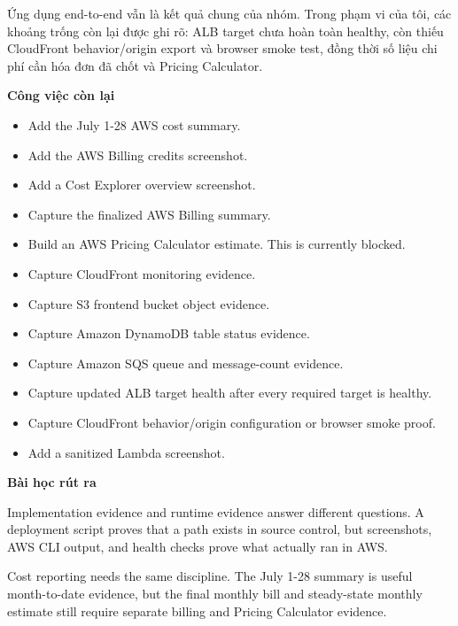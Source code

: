 Ứng dụng end-to-end vẫn là kết quả chung của nhóm. Trong phạm vi của
tôi, các khoảng trống còn lại được ghi rõ: ALB target chưa hoàn toàn
healthy, còn thiếu CloudFront behavior/origin export và browser smoke
test, đồng thời số liệu chi phí cần hóa đơn đã chốt và Pricing
Calculator.

\vspace{0.5em}\noindent\textbf{Công việc còn lại}\par

\begin{itemize}
\tightlist
\item[$\boxtimes$]
  Add the July 1-28 AWS cost summary.
\item[$\boxtimes$]
  Add the AWS Billing credits screenshot.
\item[$\boxtimes$]
  Add a Cost Explorer overview screenshot.
\item[$\square$]
  Capture the finalized AWS Billing summary.
\item[$\square$]
  Build an AWS Pricing Calculator estimate. This is currently blocked.
\item[$\boxtimes$]
  Capture CloudFront monitoring evidence.
\item[$\boxtimes$]
  Capture S3 frontend bucket object evidence.
\item[$\boxtimes$]
  Capture Amazon DynamoDB table status evidence.
\item[$\boxtimes$]
  Capture Amazon SQS queue and message-count evidence.
\item[$\square$]
  Capture updated ALB target health after every required target is
  healthy.
\item[$\square$]
  Capture CloudFront behavior/origin configuration or browser smoke
  proof.
\item[$\boxtimes$]
  Add a sanitized Lambda screenshot.
\end{itemize}

\vspace{0.5em}\noindent\textbf{Bài học rút ra}\par

Implementation evidence and runtime evidence answer different questions.
A deployment script proves that a path exists in source control, but
screenshots, AWS CLI output, and health checks prove what actually ran
in AWS.

Cost reporting needs the same discipline. The July 1-28 summary is
useful month-to-date evidence, but the final monthly bill and
steady-state monthly estimate still require separate billing and Pricing
Calculator evidence.
